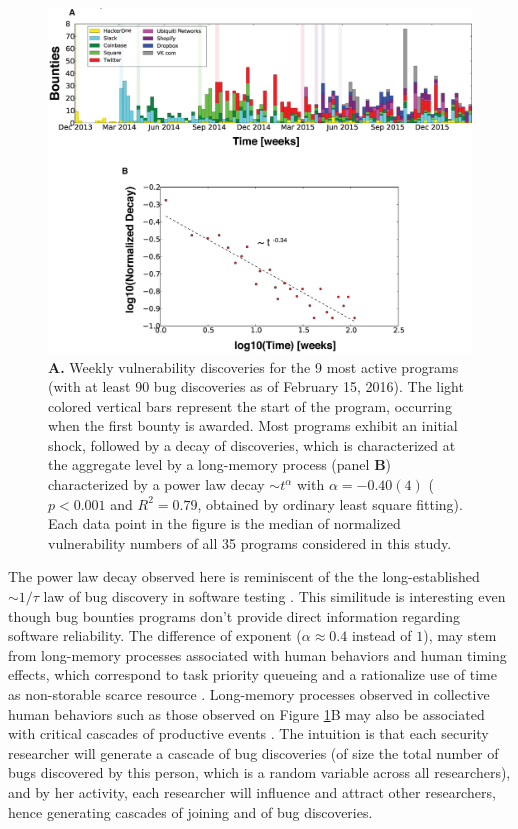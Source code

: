 \begin{figure}[h]
\begin{center}
\includegraphics[width=12cm]{../figures/timeline.eps}
\caption{\footnotesize {\bf A.} Weekly vulnerability discoveries for the 9 most active programs (with at least 90 bug discoveries as of February 15, 2016). The light colored vertical bars represent the start of the program, occurring when the first bounty is awarded. Most programs exhibit an initial shock, followed by a decay of discoveries, which is characterized at the aggregate level by a long-memory process (panel {\bf B}) characterized by a power law decay $\sim t^{\alpha}$ with $\alpha = -0.40(4)$ ($p < 0.001$ and $R^2 = 0.79$, obtained by ordinary least square fitting). Each data point in the figure is the median of normalized vulnerability numbers of all 35 programs considered in this study.}
\label{timeline}
\end{center}
\end{figure}

The power law decay observed here is reminiscent of the the long-established $\sim 1/\tau$ law of bug discovery in software testing \cite{adams1984textordfeminineoptimizing}. This similitude is interesting even though bug bounties programs don't provide direct information regarding software reliability. The difference of exponent ($\alpha \approx 0.4$ instead of $1$), may stem from long-memory processes associated with human behaviors and  human timing effects, which correspond to task priority queueing and a rationalize use of time as non-storable scarce resource \cite{maillart2011quantification}. Long-memory processes observed in collective human behaviors such as those observed on  Figure \ref{timeline}B may also be associated with critical cascades of productive events \cite{sornette2014much}. The intuition is that each security researcher will generate a cascade of bug discoveries (of size the total number of bugs discovered by this person, which is a random variable across all researchers), and by her activity, each researcher will influence and attract other researchers, hence generating cascades of joining and of bug discoveries.

